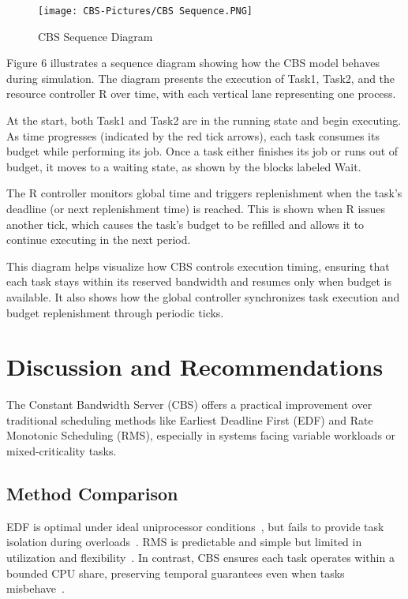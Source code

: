 \documentclass[conference]{IEEEtran}
\begin{document}
\vspace{0.2cm}
\begin{figure}[h]
    \centering
    \texttt{[image: CBS-Pictures/CBS Sequence.PNG]}
    \caption{CBS Sequence Diagram}
    \label{fig:enter-label}
\end{figure}

\noindent

Figure 6 illustrates a sequence diagram showing how the CBS model behaves during simulation. The diagram presents the execution of Task1, Task2, and the resource controller R over time, with each vertical lane representing one process.

At the start, both Task1 and Task2 are in the running state and begin executing. As time progresses (indicated by the red tick arrows), each task consumes its budget while performing its job. Once a task either finishes its job or runs out of budget, it moves to a waiting state, as shown by the blocks labeled Wait.

The R controller monitors global time and triggers replenishment when the task’s deadline (or next replenishment time) is reached. This is shown when R issues another tick, which causes the task’s budget to be refilled and allows it to continue executing in the next period.

This diagram helps visualize how CBS controls execution timing, ensuring that each task stays within its reserved bandwidth and resumes only when budget is available. It also shows how the global controller synchronizes task execution and budget replenishment through periodic ticks.


\section{\textbf{Discussion and Recommendations}}

The Constant Bandwidth Server (CBS) offers a practical improvement over traditional scheduling methods like Earliest Deadline First (EDF) and Rate Monotonic Scheduling (RMS), especially in systems facing variable workloads or mixed-criticality tasks.

\subsection{Method Comparison}

EDF is optimal under ideal uniprocessor conditions~\cite{liu1973scheduling}, but fails to provide task isolation during overloads~\cite{buttazzo2011hard}. RMS is predictable and simple but limited in utilization and flexibility~\cite{liu1973scheduling}. In contrast, CBS ensures each task operates within a bounded CPU share, preserving temporal guarantees even when tasks misbehave~\cite{baruah2004dynamic}.
\end{document}
